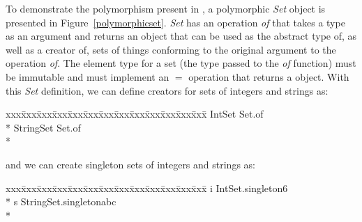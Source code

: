 To demonstrate the polymorphism present in \emd{}, a polymorphic {\em Set}
object is presented in Figure~\ref{polymorphicset}. {\em Set} 
has an
operation {\em of} that takes a type as an argument and returns
an object that can be used as the abstract type of, as well as a creator
of, sets of things conforming to the original argument to the operation
{\em of}.  The element type for a set (the type passed to the {\it of}
function) must be immutable and must
implement an $=$ operation that returns a  object. With this
{\em Set} definition, we can define creators for sets of integers and
strings as:
{\small\it\begin{tabbing}
xxx\=xxx\=xxx\=xxx\=xxx\=xxx\=xxx\=xxx\=xxx\=xxx\=xxx\=xxx\=xxx\=\+\kill%
 IntSet  Set.of\/\LB{}\/\RB{}\\*{}%
 StringSet  Set.of\/\LB{}\/\RB{}\\*{}%
\end{tabbing}\vspace{-2\topsep}}
\noindent
and we can create singleton sets of integers and strings as:
{\small\it\begin{tabbing}
xxx\=xxx\=xxx\=xxx\=xxx\=xxx\=xxx\=xxx\=xxx\=xxx\=xxx\=xxx\=xxx\=\+\kill%
 i  IntSet.singleton\/\LB{}6\/\RB{}\\*{}%
 s  StringSet.singleton\/\LB{}abc\/\RB{}\\*{}%
\end{tabbing}\vspace{-2\topsep}}
